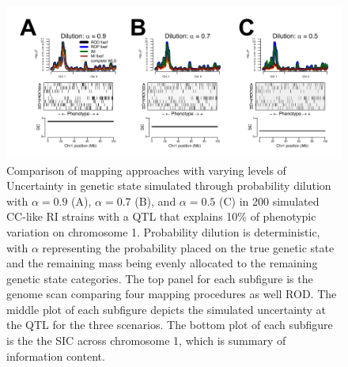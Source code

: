 \begin{figure}[h!]
\renewcommand{\familydefault}{\sfdefault}\normalfont
\centering
\includegraphics[width=\textwidth, clip, trim={0in 0in 0in 0in}]{figures/4-mi/fixef_mapping_uncertainty_dilution.pdf}
\caption[Effect of uncertainty modeled through probability dilution on genome scan in a single simulated CC-like RI panel]{Comparison of mapping approaches with varying levels of Uncertainty in genetic state simulated through probability dilution with $\alpha = 0.9$ (A), $\alpha = 0.7$ (B), and $\alpha = 0.5$ (C) in 200 simulated CC-like RI strains with a QTL that explains 10\% of phenotypic variation on chromosome 1. Probability dilution is deterministic, with $\alpha$ representing the probability placed on the true genetic state and the remaining mass being evenly allocated to the remaining genetic state categories. The top panel for each subfigure is the genome scan comparing four mapping procedures as well ROD. The middle plot of each subfigure depicts the simulated uncertainty at the QTL for the three scenarios. The bottom plot of each subfigure is the the SIC across chromosome 1, which is summary of information content.\label{fig:sim_scans_dilution}}
\end{figure}

